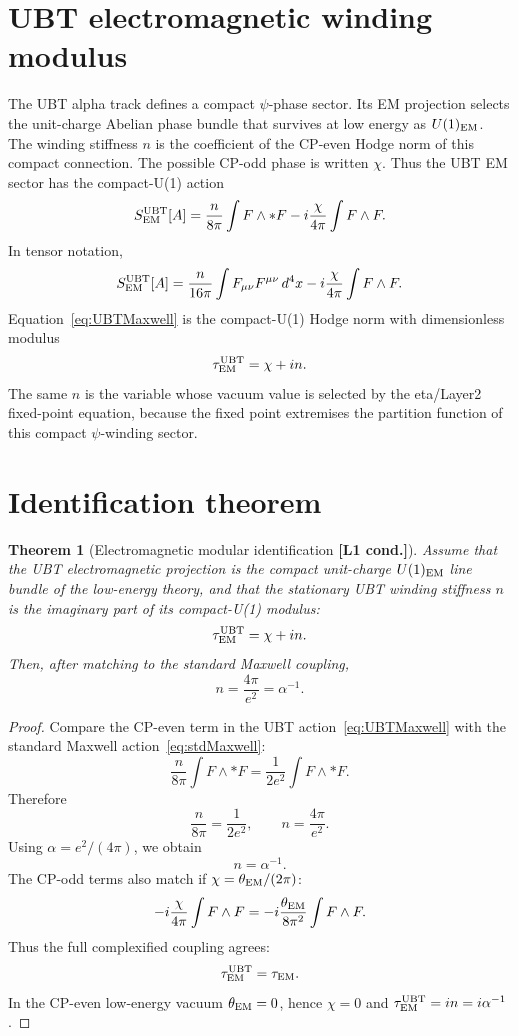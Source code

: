 \documentclass[12pt,a4paper]{article}
\newtheorem{theorem}[definition]{Theorem}
\newcommand{\Lone}{\textbf{[L1 cond.]}}
\begin{document}
\section{UBT electromagnetic winding modulus}

The UBT alpha track defines a compact \(\psi\)-phase sector.  Its EM projection
selects the unit-charge Abelian phase bundle that survives at low energy as
\(U(1)_{\rm EM}\).  The winding stiffness \(n\) is the coefficient of the
CP-even Hodge norm of this compact connection.  The possible CP-odd phase is
written \(\chi\).  Thus the UBT EM sector has the compact-U(1) action
\begin{equation}
  S^{\rm UBT}_{\rm EM}[A]
  =
  \frac{n}{8\pi}\int F\wedge *F
  - i\frac{\chi}{4\pi}\int F\wedge F .
  \label{eq:UBTMaxwell}
\end{equation}
In tensor notation,
\begin{equation}
  S^{\rm UBT}_{\rm EM}[A]
  =
  \frac{n}{16\pi}\int F_{\mu\nu}F^{\mu\nu}\,d^4x
  - i\frac{\chi}{4\pi}\int F\wedge F .
  \label{eq:UBTMaxwellComponents}
\end{equation}
Equation~\eqref{eq:UBTMaxwell} is the compact-U(1) Hodge norm with dimensionless
modulus
\begin{equation}
  \tau^{\rm UBT}_{\rm EM}=\chi+i n .
  \label{eq:tauUBT}
\end{equation}
The same \(n\) is the variable whose vacuum value is selected by the eta/Layer2
fixed-point equation, because the fixed point extremises the partition function
of this compact \(\psi\)-winding sector.

\section{Identification theorem}

\begin{theorem}[Electromagnetic modular identification \Lone]
Assume that the UBT electromagnetic projection is the compact unit-charge
\(U(1)_{\rm EM}\) line bundle of the low-energy theory, and that the stationary
UBT winding stiffness \(n\) is the imaginary part of its compact-U(1) modulus:
\[
  \tau^{\rm UBT}_{\rm EM}=\chi+i n.
\]
Then, after matching to the standard Maxwell coupling,
\[
  n=\frac{4\pi}{e^2}=\alpha^{-1}.
\]
\end{theorem}

\begin{proof}
Compare the CP-even term in the UBT action~\eqref{eq:UBTMaxwell} with the
standard Maxwell action~\eqref{eq:stdMaxwell}:
\[
  \frac{n}{8\pi}\int F\wedge *F
  =
  \frac{1}{2e^2}\int F\wedge *F .
\]
Therefore
\[
  \frac{n}{8\pi}=\frac{1}{2e^2},
  \qquad
  n=\frac{4\pi}{e^2}.
\]
Using \(\alpha=e^2/(4\pi)\), we obtain
\[
  n=\alpha^{-1}.
\]
The CP-odd terms also match if \(\chi=\theta_{\rm EM}/(2\pi)\):
\[
  -i\frac{\chi}{4\pi}\int F\wedge F
  =
  -i\frac{\theta_{\rm EM}}{8\pi^2}\int F\wedge F .
\]
Thus the full complexified coupling agrees:
\[
  \tau^{\rm UBT}_{\rm EM}=\tau_{\rm EM}.
\]
In the CP-even low-energy vacuum \(\theta_{\rm EM}=0\), hence \(\chi=0\) and
\(\tau^{\rm UBT}_{\rm EM}=i n=i\alpha^{-1}\).
\end{proof}
\end{document}
